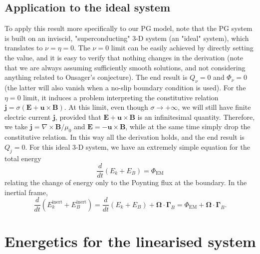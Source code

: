 \subsection{Application to the ideal system}

To apply this result more specifically to our PG model, note that the PG system is built on an inviscid, "superconducting" 3-D system (an "ideal" system), which translates to $\nu = \eta = 0$. The $\nu=0$ limit can be easily achieved by directly setting the value, and it is easy to verify that nothing changes in the derivation (note that we are always assuming sufficiently smooth solutions, and not considering anything related to Onsager's conjecture). The end result is $Q_\nu = 0$ and $\Phi_\nu = 0$ (the latter will also vanish when a no-slip boundary condition is used). For the $\eta = 0$ limit, it induces a problem interpreting the constitutive relation $\mathbf{j} = \sigma (\mathbf{E} + \mathbf{u}\times \mathbf{B})$. At this limit, even though $\sigma \rightarrow +\infty$, we will still have finite electric current $\mathbf{j}$, provided that $\mathbf{E} + \mathbf{u}\times \mathbf{B}$ is an infinitesimal quantity. Therefore, we take $\mathbf{j}= \nabla\times \mathbf{B}/\mu_0$ and $\mathbf{E} = -\mathbf{u}\times \mathbf{B}$, while at the same time simply drop the constitutive relation. In this way all the derivation holds, and the end result is $Q_j = 0$. For this ideal 3-D system, we have an extremely simple equation for the total energy
%
\begin{equation}
    \frac{d}{dt}(E_k + E_B) = \Phi_\mathrm{EM}
\end{equation}
%
relating the change of energy only to the Poynting flux at the boundary. In the inertial frame,
%
\begin{equation}
    \frac{d}{dt} (E_k^\mathrm{inert} + E_B^\mathrm{inert}) = \frac{d}{dt}(E_k + E_B) + \boldsymbol{\Omega}\cdot \boldsymbol{\Gamma}_B = \Phi_\mathrm{EM} + \boldsymbol{\Omega}\cdot \boldsymbol{\Gamma}_B.
\end{equation}
%


\section{Energetics for the linearised system}

